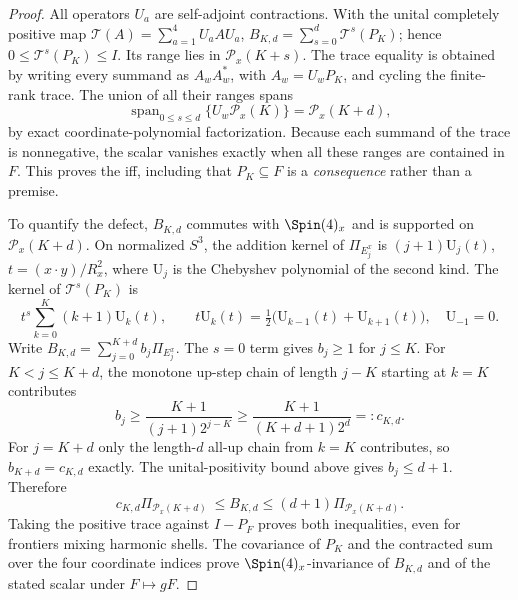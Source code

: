 \documentclass[12pt,a4paper]{article}
\begin{document}
\begin{proof}
All operators $U_a$ are self-adjoint contractions.  With the unital
completely positive map $\mathcal T(A)=\sum_{a=1}^4U_aAU_a$,
$B_{K,d}=\sum_{s=0}^d\mathcal T^s(P_K)$; hence
$0\le\mathcal T^s(P_K)\le I$. Its range lies in
$\mathcal P_x(K+s)$. The trace equality is obtained by writing every
summand as $A_w A_w^*$, with $A_w=U_wP_K$, and cycling the finite-rank
trace. The union of all their ranges spans
\[
 \operatorname{span}_{0\le s\le d}\{U_w\mathcal P_x(K)\}
 =\mathcal P_x(K+d),
\]
by exact coordinate-polynomial factorization.  Because each summand
of the trace is nonnegative, the scalar vanishes exactly when all
these ranges are contained in $F$.  This proves the iff, including
that $P_K\subseteq F$ is a \emph{consequence} rather than a premise.

To quantify the defect, $B_{K,d}$ commutes with $\Spin(4)_x$ and is
supported on $\mathcal P_x(K+d)$. On normalized $S^3$, the addition
kernel of $\Pi_{E_j^x}$ is $(j+1)\mathrm U_j(t)$,
$t=(x\cdot y)/R_x^2$, where $\mathrm U_j$ is the Chebyshev polynomial
of the second kind. The kernel of $\mathcal T^s(P_K)$ is
\[
 t^s\sum_{k=0}^K(k+1)\mathrm U_k(t),\qquad
 t\mathrm U_k(t)=\tfrac12\bigl(\mathrm U_{k-1}(t)+
 \mathrm U_{k+1}(t)\bigr),\quad \mathrm U_{-1}=0.
\]
Write $B_{K,d}=\sum_{j=0}^{K+d}b_j\Pi_{E_j^x}$.
The $s=0$ term gives $b_j\ge1$ for $j\le K$. For
$K<j\le K+d$, the monotone up-step chain of length $j-K$
starting at $k=K$ contributes
\[
 b_j\ge\frac{K+1}{(j+1)2^{j-K}}
 \ge\frac{K+1}{(K+d+1)2^d}=:c_{K,d}.
\]
For $j=K+d$ only the length-$d$ all-up chain from $k=K$
contributes, so $b_{K+d}=c_{K,d}$ exactly. The unital-positivity
bound above gives $b_j\le d+1$. Therefore
\[
 c_{K,d}\Pi_{\mathcal P_x(K+d)}\ \le B_{K,d}\le
 (d+1)\Pi_{\mathcal P_x(K+d)}.
\]
Taking the positive trace against $I-P_F$ proves both inequalities,
even for frontiers mixing harmonic shells. The covariance of $P_K$
and the contracted sum over the four coordinate indices prove
$\Spin(4)_x$-invariance of $B_{K,d}$ and of the stated scalar under
$F\mapsto gF$.
\end{proof}
\end{document}
